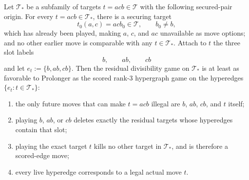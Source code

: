 \begin{proposition}\label{prop:t2-residual-embedding}
Let $\mathcal T_*$ be a subfamily of targets $t=acb\in\mathcal T$ with the
following secured-pair origin.  For every $t=acb\in\mathcal T_*$, there is a
securing target
\[
  t_0(a,c)=acb_0\in\mathcal T,\qquad b_0\ne b,
\]
which has already been played, making $a$, $c$, and $ac$ unavailable as move
options; and no other earlier move is comparable with any
$t\in\mathcal T_*$.  Attach to $t$ the three slot labels
\[
  b,\qquad ab,\qquad cb
\]
and let $e_t:=\{b,ab,cb\}$.  Then the residual divisibility game on
$\mathcal T_*$ is at least as favorable to Prolonger as the scored rank-$3$
hypergraph game on the hyperedges $\{e_t:t\in\mathcal T_*\}$:
\begin{enumerate}
  \item the only future moves that can make $t=acb$ illegal are
    $b$, $ab$, $cb$, and $t$ itself;
  \item playing $b$, $ab$, or $cb$ deletes exactly the residual targets whose
    hyperedges contain that slot;
  \item playing the exact target $t$ kills no other target in $\mathcal T_*$,
    and is therefore a scored-edge move;
  \item every live hyperedge corresponds to a legal actual move $t$.
\end{enumerate}
\end{proposition}

